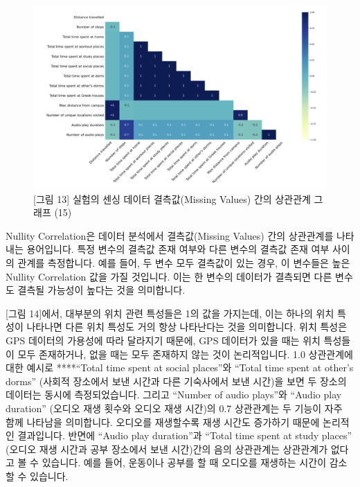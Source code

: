\documentclass[
  letterpaper,
]{book}
\begin{document}
\begin{figure}[H]

{\centering \includegraphics{img/fig13.png}

}

\caption{{[}그림 13{]} 실험의 센싱 데이터 결측값(Missing Values) 간의
상관관계 그래프 (15)}

\end{figure}%

Nullity Correlation은 데이터 분석에서 결측값(Missing Values) 간의
상관관계를 나타내는 용어입니다. 특정 변수의 결측값 존재 여부와 다른
변수의 결측값 존재 여부 사이의 관계를 측정합니다. 예를 들어, 두 변수
모두 결측값이 있는 경우, 이 변수들은 높은 Nullity Correlation 값을 가질
것입니다. 이는 한 변수의 데이터가 결측되면 다른 변수도 결측될 가능성이
높다는 것을 의미합니다.

{[}그림 14{]}에서, 대부분의 위치 관련 특성들은 1의 값을 가지는데, 이는
하나의 위치 특성이 나타나면 다른 위치 특성도 거의 항상 나타난다는 것을
의미합니다. 위치 특성은 GPS 데이터의 가용성에 따라 달라지기 때문에, GPS
데이터가 있을 때는 위치 특성들이 모두 존재하거나, 없을 때는 모두
존재하지 않는 것이 논리적입니다. 1.0 상관관계에 대한 예시로 ****``Total
time spent at social places''와 ``Total time spent at other's dorms''
(사회적 장소에서 보낸 시간과 다른 기숙사에서 보낸 시간)을 보면 두 장소의
데이터는 동시에 측정되었습니다. 그리고 ``Number of audio plays''와
``Audio play duration'' (오디오 재생 횟수와 오디오 재생 시간)의 0.7
상관관계는 두 기능이 자주 함께 나타남을 의미합니다. 오디오를 재생할수록
재생 시간도 증가하기 때문에 논리적인 결과입니다. 반면에 ``Audio play
duration''과 ``Total time spent at study places'' (오디오 재생 시간과
공부 장소에서 보낸 시간)간의 음의 상관관계는 상관관계가 없다고 볼 수
있습니다. 예를 들어, 운동이나 공부를 할 때 오디오를 재생하는 시간이
감소할 수 있습니다.
\end{document}
